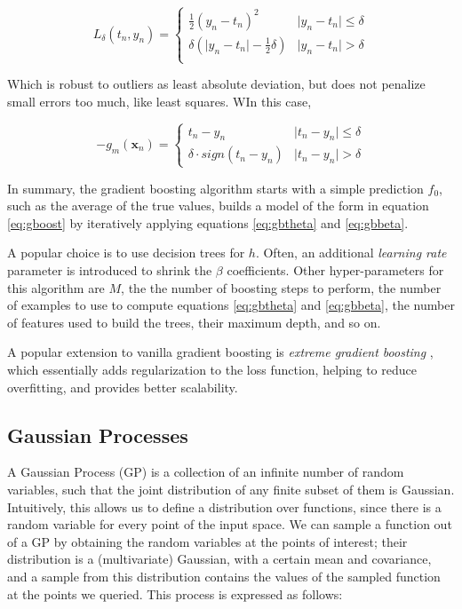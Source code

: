 \documentclass[12pt]{book}
\begin{document}
\begin{equation}
\label{eq:huberloss}
L_\delta(t_n,y_n)=\begin{cases}
\frac{1}{2}(y_n-t_n)^2 & \vert y_n-t_n \vert \leq \delta \\
\delta(\vert y_n-t_n\vert-\frac{1}{2}\delta) & \vert y_n-t_n \vert > \delta \\
\end{cases}
\end{equation}

Which is robust to outliers as least absolute deviation, but does not penalize small errors too much, like least squares. WIn this case,

\begin{equation}
-g_m(\bm x_n)=\begin{cases}
t_n-y_n & \vert t_n-y_n\vert\leq\delta \\
\delta\cdot sign(t_n-y_n) & \vert t_n-y_n\vert>\delta
\end{cases}
\end{equation}

In summary, the gradient boosting algorithm starts with a simple prediction $f_0$, such as the average of the true values, builds a model of the form in equation \ref{eq:gboost} by iteratively applying equations \ref{eq:gbtheta} and \ref{eq:gbbeta}.

A popular choice is to use decision trees for $h$. Often, an additional \emph{learning rate} parameter is introduced to shrink the $\beta$ coefficients. Other hyper-parameters for this algorithm are $M$, the the number of boosting steps to perform, the number of examples to use to compute equations \ref{eq:gbtheta} and \ref{eq:gbbeta}, the number of features used to build the trees, their maximum depth, and so on.

A popular extension to vanilla gradient boosting is \emph{extreme gradient boosting} \citep{xgboost}, which essentially adds regularization to the loss function, helping to reduce overfitting, and provides better scalability.

\subsection{Gaussian Processes}
A Gaussian Process (GP) is a collection of an infinite number of random variables, such that the joint distribution of any finite subset of them is Gaussian. Intuitively, this allows us to define a distribution over functions, since there is a random variable for every point of the input space. We can sample a function out of a GP by obtaining the random variables at the points of interest; their distribution is a (multivariate) Gaussian, with a certain mean and covariance, and a sample from this distribution contains the values of the sampled function at the points we queried. This process is expressed as follows:
\end{document}
